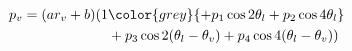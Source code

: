 \begin{align}
p_v=(ar_v+b)(1&\color{grey}{+p_1\cos 2\theta_l + p_2\cos 4\theta_l} \\
                             &+ p_3\cos 2(\theta_l-\theta_v) + p_4\cos 4(\theta_l-\theta_v))
\end{align}
